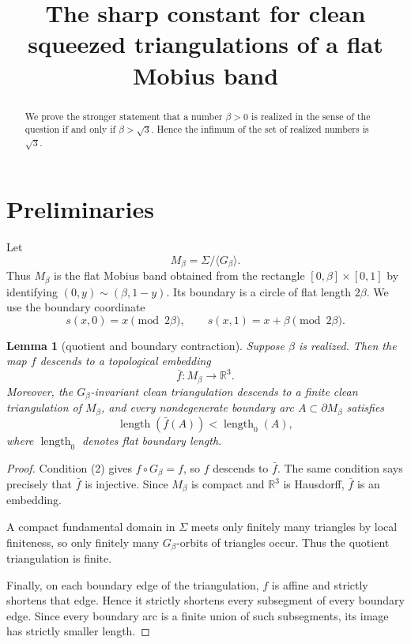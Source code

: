 \documentclass[11pt]{article}
\title{The sharp constant for clean squeezed triangulations of a flat Mobius band}
\author{}
\date{}
\newtheorem{lemma}[theorem]{Lemma}
\newcommand{\R}{\mathbb R}
\newcommand{\len}{\operatorname{length}}
\begin{document}
\maketitle

\begin{abstract}
We prove the stronger statement that a number \(\beta>0\) is realized in the sense of the question if and only if \(\beta>\sqrt 3\).  Hence the infimum of the set of realized numbers is \(\sqrt 3\).
\end{abstract}

\section{Preliminaries}

Let
\[
M_\beta=\Sigma/\langle G_\beta\rangle .
\]
Thus \(M_\beta\) is the flat Mobius band obtained from the rectangle
\([0,\beta]\times[0,1]\) by identifying \((0,y)\sim(\beta,1-y)\).  Its boundary is a circle of flat length \(2\beta\).  We use the boundary coordinate
\[
s(x,0)=x\pmod {2\beta},\qquad s(x,1)=x+\beta\pmod {2\beta}.
\]

\begin{lemma}[quotient and boundary contraction]
Suppose \(\beta\) is realized.  Then the map \(f\) descends to a topological embedding
\[
\bar f:M_\beta\longrightarrow \R^3 .
\]
Moreover, the \(G_\beta\)-invariant clean triangulation descends to a finite clean triangulation of \(M_\beta\), and every nondegenerate boundary arc \(A\subset \partial M_\beta\) satisfies
\[
\len(\bar f(A))<\len_0(A),
\]
where \(\len_0\) denotes flat boundary length.
\end{lemma}

\begin{proof}
Condition (2) gives \(f\circ G_\beta=f\), so \(f\) descends to \(\bar f\).  The same condition says precisely that \(\bar f\) is injective.  Since \(M_\beta\) is compact and \(\R^3\) is Hausdorff, \(\bar f\) is an embedding.

A compact fundamental domain in \(\Sigma\) meets only finitely many triangles by local finiteness, so only finitely many \(G_\beta\)-orbits of triangles occur.  Thus the quotient triangulation is finite.

Finally, on each boundary edge of the triangulation, \(f\) is affine and strictly shortens that edge.  Hence it strictly shortens every subsegment of every boundary edge.  Since every boundary arc is a finite union of such subsegments, its image has strictly smaller length.
\end{proof}
\end{document}
